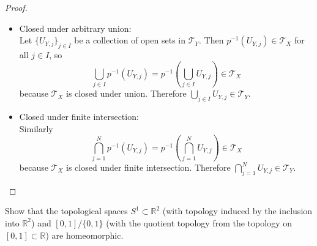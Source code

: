 \documentclass{article}
\newenvironment{problem}[2][Problem]{\begin{trivlist}
\item[\hskip \labelsep {\bfseries #1}\hskip \labelsep {\bfseries #2.}]}{\end{trivlist}}
\begin{document}
\begin{proof}
\begin{itemize}
    \item Closed under arbitrary union:\\
    Let $\{U_{Y,j}\}_{j \in I}$ be a collection of open sets in $\mathcal{T}_Y$.
    Then $p^{-1}(U_{Y, j}) \in \mathcal{T}_X$ for all $j \in I$, so \[
      \bigcup\limits_{j\in I} p^{-1}(U_{Y,j})
      = p^{-1}(\bigcup\limits_{j\in I} U_{Y,j})
      \in \mathcal{T}_X
    \] because $\mathcal{T}_X$ is closed under union.
    Therefore $\bigcup_{j\in I} U_{Y, j} \in \mathcal{T}_Y$.
    \item Closed under finite intersection:\\
    Similarly \[
      \bigcap_{j = 1}^N p^{-1}(U_{Y, j})
      = p^{-1}\left(\bigcap_{j = 1}^N U_{Y, j}\right)
      \in \mathcal{T}_X
    \] because $\mathcal{T}_X$ is closed under finite intersection.
    Therefore $\bigcap_{j = 1}^N U_{Y, j} \in \mathcal{T}_Y$.
  \end{itemize}
\end{proof}

\pagebreak

\begin{problem}{2}
  Show that the topological spaces $S^1 \subset \mathbb{R}^2$
  (with topology induced by the inclusion into $\mathbb{R}^2$)
  and $[0, 1]/\{0, 1\}$
  (with the quotient topology from the topology on $[0, 1] \subset \mathbb{R}$)
  are homeomorphic.
\end{problem}
\end{document}
